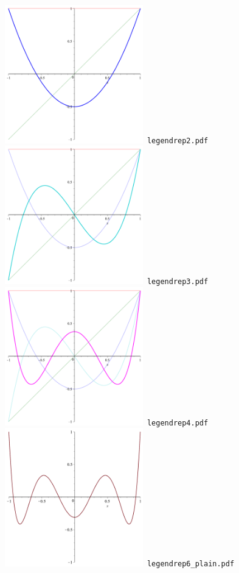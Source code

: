 \documentclass[a4paper]{amsart}
\begin{document}
\includegraphics[width=6cm]{legendrep2.pdf}\verb+ legendrep2.pdf+\\
\includegraphics[width=6cm]{legendrep3.pdf}\verb+ legendrep3.pdf+\\
\includegraphics[width=6cm]{legendrep4.pdf}\verb+ legendrep4.pdf+\\
\includegraphics[width=6cm]{legendrep6_plain.pdf}\verb+ legendrep6_plain.pdf+\\
\end{document}
